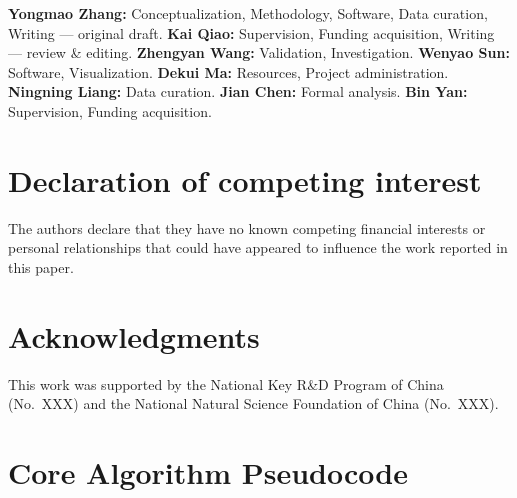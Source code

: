 \documentclass[a4paper,fleqn]{cas-dc}
\begin{document}
\textbf{Yongmao Zhang:} Conceptualization, Methodology, Software, Data curation, Writing --- original draft. \textbf{Kai Qiao:} Supervision, Funding acquisition, Writing --- review \& editing. \textbf{Zhengyan Wang:} Validation, Investigation. \textbf{Wenyao Sun:} Software, Visualization. \textbf{Dekui Ma:} Resources, Project administration. \textbf{Ningning Liang:} Data curation. \textbf{Jian Chen:} Formal analysis. \textbf{Bin Yan:} Supervision, Funding acquisition.

\section*{Declaration of competing interest}
The authors declare that they have no known competing financial interests or personal relationships that could have appeared to influence the work reported in this paper.

\section*{Acknowledgments}
This work was supported by the National Key R\&D Program of China (No.~XXX) and the National Natural Science Foundation of China (No.~XXX).




\clearpage
\appendix

\section{Core Algorithm Pseudocode}
\label{app:algorithm}
\end{document}
